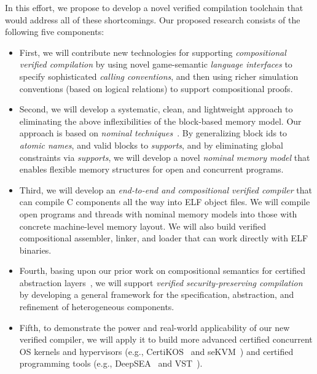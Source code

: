 In this effort, we propose to develop a novel verified compilation
toolchain that would address all of these shortcomings. Our
proposed research consists of the following five components:
\begin{itemize}
\item First, we will contribute new technologies for supporting {\em
  compositional verified compilation} by using novel game-semantic
  {\em language interfaces} to specify sophisticated {\em calling
    conventions}, and then using richer simulation conventions (based
  on logical relations) to support compositional proofs.
\item Second, we will develop a systematic, clean, and lightweight approach to
  eliminating the above inflexibilities of the block-based memory
  model. Our approach is based on \emph{nominal
  techniques}~\cite{pitts-nominal,gabby2002}. By generalizing block
  ids to {\em atomic names}, and valid blocks to {\em supports}, and by
  eliminating global constraints via {\em supports}, we will develop a
  novel {\em nominal memory model} that enables flexible memory
  structures for open and concurrent programs.
\item Third, we will develop an {\em end-to-end and compositional
  verified compiler} that can compile C components all the way into
  ELF object files. We will compile open programs and threads with
  nominal memory models into those with concrete machine-level memory
  layout. We will also build verified compositional assembler,
  linker, and loader that can work directly with ELF binaries.
\item Fourth, basing upon our prior work on compositional semantics
  for certified abstraction layers~\cite{dscal15,ccal18,koenig20,layered22},
  we will support {\em verified security-preserving
  compilation}~\cite{costanzo16} by developing a general framework
  for the specification, abstraction, and refinement of heterogeneous
  components.
\item Fifth, to demonstrate the power and real-world applicability of
  our new verified compiler, we will apply it to build more advanced
  certified concurrent OS kernels and hypervisors (e.g., CertiKOS~\cite{certikos-osdi16}
  and seKVM~\cite{sekvm21a,sekvm21b,tao21}) and certified programming tools
    (e.g., DeepSEA~\cite{deepsea19} and VST~\cite{appel11:vst}).
\end{itemize}

